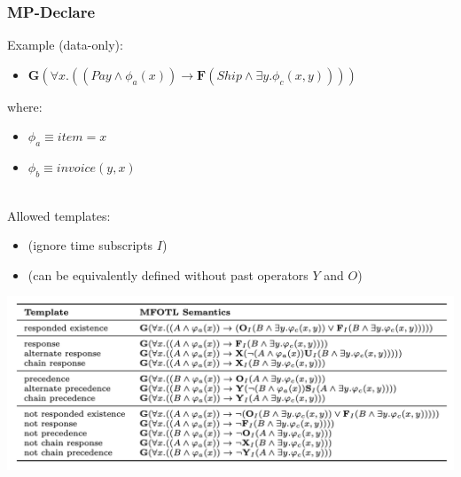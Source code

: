 \documentclass{beamer}
\newcommand{\always}{\mathbf{G}}
\newcommand{\eventually}{\mathbf{F}}
\begin{document}

\begin{frame}
\frametitle{MP-Declare}
Example (data-only):

\begin{itemize}
	\item $\always(\forall x.((Pay\land\phi_a(x)) \rightarrow \eventually (Ship \land\exists y.\phi_c(x, y))))$
\end{itemize}

where:
\begin{itemize}
	\item $\phi_a\equiv item=x$ 
	\item $\phi_b\equiv invoice(y,x)$ 
\end{itemize}

~\\

Allowed templates:
\begin{scriptsize}
\begin{itemize}
	\item (ignore time subscripts $I$)
	\item (can be equivalently defined without past operators $Y$ and $O$)
\end{itemize}
\end{scriptsize}

\begin{center}
\includegraphics[scale=.3]{figures/mp-declare}
\end{center}



\end{frame}

\end{document}
